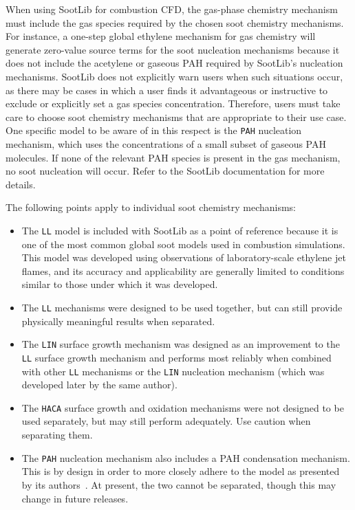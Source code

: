 \documentclass[preprint,letterpaper]{elsarticle}
\begin{document}
When using SootLib for combustion CFD, the gas-phase chemistry mechanism must include the gas species required by the chosen soot chemistry mechanisms. For instance, a one-step global ethylene mechanism for gas chemistry will generate zero-value source terms for the soot nucleation mechanisms because it does not include the acetylene or gaseous PAH required by SootLib's nucleation mechanisms. SootLib does not explicitly warn users when such situations occur, as there may be cases in which a user finds it advantageous or instructive to exclude or explicitly set a gas species concentration. Therefore, users must take care to choose soot chemistry mechanisms that are appropriate to their use case. One specific model to be aware of in this respect is the \texttt{PAH} nucleation mechanism, which uses the concentrations of a small subset of gaseous PAH molecules. If none of the relevant PAH species is present in the gas mechanism, no soot nucleation will occur. Refer to the SootLib documentation for more details.

The following points apply to individual soot chemistry mechanisms:
\begin{itemize}
    \item The \texttt{LL} model is included with SootLib as a point of reference because it is one of the most common global soot models used in combustion simulations. This model was developed using observations of laboratory-scale ethylene jet flames, and its accuracy and applicability are generally limited to conditions similar to those under which it was developed.
    \item The \texttt{LL} mechanisms were designed to be used together, but can still provide physically meaningful results when separated.
    \item The \texttt{LIN} surface growth mechanism was designed as an improvement to the \texttt{LL} surface growth mechanism and performs most reliably when combined with other \texttt{LL} mechanisms or the \texttt{LIN} nucleation mechanism (which was developed later by the same author).
    \item The \texttt{HACA} surface growth and oxidation mechanisms were not designed to be used separately, but may still perform adequately. Use caution when separating them.
    \item The \texttt{PAH} nucleation mechanism also includes a PAH condensation mechanism. This is by design in order to more closely adhere to the model as presented by its authors~\cite{Blanquart_2009c}. At present, the two cannot be separated, though this may change in future releases.
\end{itemize}
\end{document}
